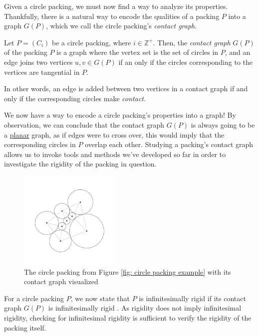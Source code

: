 \begin{flushleft}
Given a circle packing, we must now find a way to analyze its properties. Thankfully, there is a natural way to encode the qualities of a packing $P$ into a graph $G(P)$, which we call the circle packing's \textit{contact graph}.
\end{flushleft}

\begin{definition}
Let $P = (C_i)$ be a circle packing, where $i \in \mathbb{Z}^+$. Then, the \textit{contact graph} $G(P)$ of the packing $P$ is a graph where the vertex set is the set of circles in $P$, and an edge joins two vertices $u, v \in G(P)$ if an only if the circles corresponding to the vertices are tangential in $P$.
\end{definition}

\begin{flushleft}
In other words, an edge is added between two vertices in a contact graph if and only if the corresponding circles make \textit{contact}.
\end{flushleft}

\begin{flushleft}
We now have a way to encode a circle packing's properties into a graph! By observation, we can conclude that the contact graph $G(P)$ is always going to be a \hyperref[def: planar graphs]{planar} graph, as if edges were to cross over, this would imply that the corresponding circles in $P$ overlap each other. Studying a packing's contact graph allows us to invoke tools and methods we've developed so far in order to investigate the rigidity of the packing in question. 
\end{flushleft}

\begin{figure}[htbp]
    \centering
    \includegraphics[width = 0.42\textwidth]{Chapter 3/8. Packing with contact.png}
    \caption{The circle packing from Figure \ref{fig: circle packing example} with its contact graph visualized}
    \label{fig: circle packing with contact}
\end{figure}
\vspace{-4 mm}
\begin{flushleft}
For a circle packing $P$, we now state that $P$ is infinitesimally rigid if its contact graph $G(P)$ is infinitesimally rigid \cite{sticky}. As rigidity does not imply infinitesimal rigidity, checking for infinitesimal rigidity is sufficient to verify the rigidity of the packing itself. 
\end{flushleft}

